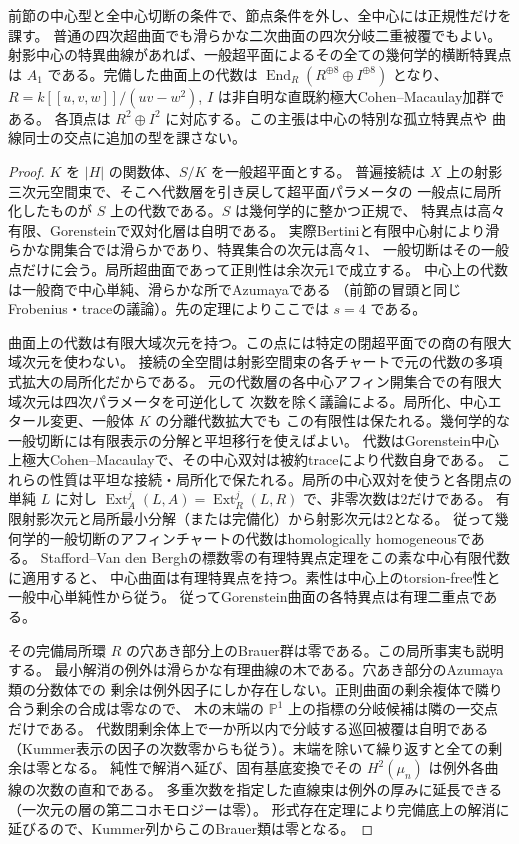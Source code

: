 \begin{theorem}\label{thm:central-cut-transverse-a-one}
前節の中心型と全中心切断の条件で、節点条件を外し、全中心には正規性だけを課す。
普通の四次超曲面でも滑らかな二次曲面の四次分岐二重被覆でもよい。
射影中心の特異曲線があれば、一般超平面によるその全ての幾何学的横断特異点は
$A_1$ である。完備した曲面上の代数は
$\operatorname{End}_R(R^{\oplus8}\oplus I^{\oplus8})$ となり、
$R=k[[u,v,w]]/(uv-w^2)$, $I$ は非自明な直既約極大Cohen--Macaulay加群である。
各頂点は $R^2\oplus I^2$ に対応する。この主張は中心の特別な孤立特異点や
曲線同士の交点に追加の型を課さない。
\end{theorem}
\begin{proof}
$K$ を $|H|$ の関数体、$S/K$ を一般超平面とする。
普遍接続は $X$ 上の射影三次元空間束で、そこへ代数層を引き戻して超平面パラメータの
一般点に局所化したものが $S$ 上の代数である。$S$ は幾何学的に整かつ正規で、
特異点は高々有限、Gorensteinで双対化層は自明である。
実際Bertiniと有限中心射により滑らかな開集合では滑らかであり、特異集合の次元は高々1、
一般切断はその一般点だけに会う。局所超曲面であって正則性は余次元1で成立する。
中心上の代数は一般商で中心単純、滑らかな所でAzumayaである
（前節の冒頭と同じFrobenius・traceの議論）。先の定理によりここでは $s=4$ である。

曲面上の代数は有限大域次元を持つ。この点には特定の閉超平面での商の有限大域次元を使わない。
接続の全空間は射影空間束の各チャートで元の代数の多項式拡大の局所化だからである。
元の代数層の各中心アフィン開集合での有限大域次元は四次パラメータを可逆化して
次数を除く議論による。局所化、中心エタール変更、一般体 $K$ の分離代数拡大でも
この有限性は保たれる。幾何学的な一般切断には有限表示の分解と平坦移行を使えばよい。
代数はGorenstein中心上極大Cohen--Macaulayで、その中心双対は被約traceにより代数自身である。
これらの性質は平坦な接続・局所化で保たれる。局所の中心双対を使うと各閉点の単純 $L$ に対し
$\operatorname{Ext}^j_A(L,A)=\operatorname{Ext}^j_R(L,R)$ で、非零次数は2だけである。
有限射影次元と局所最小分解（または完備化）から射影次元は2となる。
従って幾何学的一般切断のアフィンチャートの代数はhomologically homogeneousである。
Stafford--Van den Berghの標数零の有理特異点定理をこの素な中心有限代数に適用すると、
中心曲面は有理特異点を持つ。素性は中心上のtorsion-free性と一般中心単純性から従う。
従ってGorenstein曲面の各特異点は有理二重点である。

その完備局所環 $R$ の穴あき部分上のBrauer群は零である。この局所事実も説明する。
最小解消の例外は滑らかな有理曲線の木である。穴あき部分のAzumaya類の分数体での
剰余は例外因子にしか存在しない。正則曲面の剰余複体で隣り合う剰余の合成は零なので、
木の末端の $\mathbb P^1$ 上の指標の分岐候補は隣の一交点だけである。
代数閉剰余体上で一か所以内で分岐する巡回被覆は自明である
（Kummer表示の因子の次数零からも従う）。末端を除いて繰り返すと全ての剰余は零となる。
純性で解消へ延び、固有基底変換でその $H^2(\mu_n)$ は例外各曲線の次数の直和である。
多重次数を指定した直線束は例外の厚みに延長できる（一次元の層の第二コホモロジーは零）。
形式存在定理により完備底上の解消に延びるので、Kummer列からこのBrauer類は零となる。


\end{proof}
